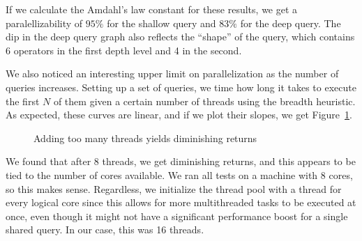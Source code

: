 \documentclass[a4paper, 12pt]{article}
\begin{document}
 \medskip
 If we calculate the Amdahl's law constant for these results, we get a paralellizability of $95\%$ for the shallow query and $83\%$ for the deep query. The dip in the deep query graph also reflects the ``shape'' of the query, which contains 6 operators in the first depth level and 4 in the second. 
 
 \medskip
 We also noticed an interesting upper limit on parallelization as the number of queries increases. Setting up a set of queries, we time how long it takes to execute the first $N$ of them given a certain number of threads using the breadth heuristic. As expected, these curves are linear, and if we plot their slopes, we get Figure~\ref{fig:parallel}.

 \begin{figure}[ht]
    \centering
        \caption{Adding too many threads yields diminishing returns}
        \label{fig:parallel}
 \end{figure}

\medskip
We found that after $8$ threads, we get diminishing returns, and this appears to be tied to the number of cores available. We ran all tests on a machine with 8 cores, so this makes sense. Regardless, we initialize the thread pool with a thread for every logical core since this allows for more multithreaded tasks to be executed at once, even though it might not have a significant performance boost for a single shared query. In our case, this was 16 threads.
\end{document}
